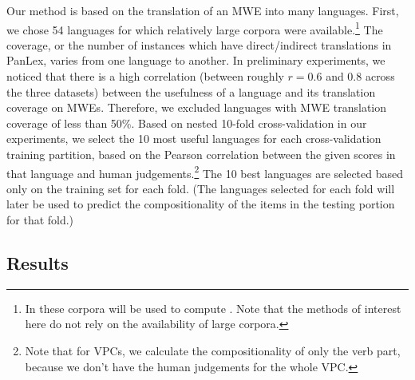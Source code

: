 \documentclass[output=paper
,modfonts
,nonflat]{langsci/langscibook}
\begin{document}
Our method is based on the translation of an MWE into many
languages. First, we chose 54 languages for which
relatively large corpora were available.\footnote{In
   these corpora will be used to compute
  . Note that the  methods of interest here do not rely on the
  availability of large corpora.} The coverage, or the number of
instances which have direct/indirect translations in PanLex, varies
from one language to another. In preliminary experiments, we noticed
that there is a high correlation (between roughly $r = 0.6$ and 0.8 across
the three datasets) between the usefulness of a language and its
translation coverage on MWEs. Therefore, we excluded languages with
MWE translation coverage of less than 50\%. Based on nested 10-fold
cross-validation in our experiments, we select the 10 most useful
languages for each cross-validation training partition, based on the
Pearson correlation between the given scores in that language and
human judgements.\footnote{Note that for VPCs, we calculate the
  compositionality of only the verb part, because we don't have the
  human judgements for the whole VPC.}  The 10 best languages are
selected based only on the training set for each fold. (The languages
selected for each fold will later be used to predict the
compositionality of the items in the testing portion for that fold.)




\subsection{Results\label{sec:ss:results}}
\end{document}

